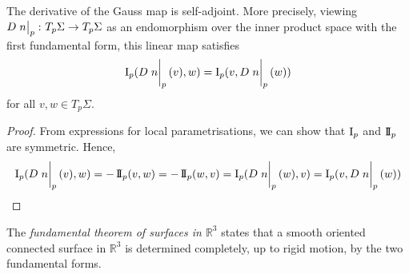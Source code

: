 \begin{lemma}
	The derivative of the Gauss map is self-adjoint.
	More precisely, viewing \( D \eval{n}_p \colon T_p \Sigma \to T_p \Sigma \) as an endomorphism over the inner product space with the first fundamental form, this linear map satisfies
	\[ \Iff_p(D \eval{n}_p(v), w) = \Iff_p(v, D \eval{n}_p(w)) \]
	for all \( v, w \in T_p \Sigma \).
\end{lemma}
\begin{proof}
	From expressions for local parametrisations, we can show that \( \operatorname{\mathrm{I}}_p \) and \( \operatorname{\mathrm{I\!I}}_p \) are symmetric.
	Hence,
	\[ \Iff_p(D\eval{n}_p(v),w) = -\IIff_p(v,w) = -\IIff_p(w,v) = \Iff_p(D \eval{n}_p(w),v) = \Iff_p(v,D\eval{n}_p(w)) \]
\end{proof}
\begin{remark}
	The \textit{fundamental theorem of surfaces in \( \mathbb R^3 \)} states that a smooth oriented connected surface in \( \mathbb R^3 \) is determined completely, up to rigid motion, by the two fundamental forms.
\end{remark}

